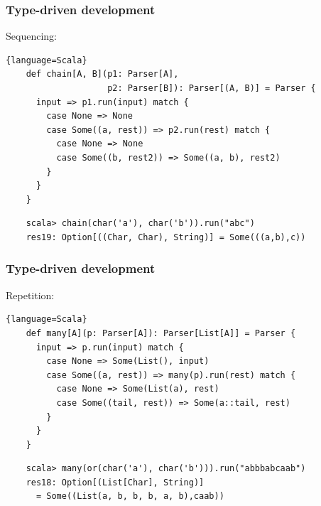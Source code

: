 \documentclass{beamer}
\begin{document}
\begin{frame}[containsverbatim]
  \frametitle{Type-driven development} 

  Sequencing:

  \begin{lstlisting}{language=Scala}
    def chain[A, B](p1: Parser[A],
                    p2: Parser[B]): Parser[(A, B)] = Parser {
      input => p1.run(input) match {
        case None => None
        case Some((a, rest)) => p2.run(rest) match {
          case None => None
          case Some((b, rest2)) => Some((a, b), rest2)
        }
      }
    }
  \end{lstlisting}

  \begin{lstlisting}
    scala> chain(char('a'), char('b')).run("abc")
    res19: Option[((Char, Char), String)] = Some(((a,b),c))
  \end{lstlisting}
  
\end{frame}



\begin{frame}[containsverbatim]
  \frametitle{Type-driven development} 

  Repetition:

  \begin{lstlisting}{language=Scala}
    def many[A](p: Parser[A]): Parser[List[A]] = Parser {
      input => p.run(input) match {
        case None => Some(List(), input)
        case Some((a, rest)) => many(p).run(rest) match {
          case None => Some(List(a), rest)
          case Some((tail, rest)) => Some(a::tail, rest)
        }               
      }
    }
  \end{lstlisting}

  \begin{lstlisting}
    scala> many(or(char('a'), char('b'))).run("abbbabcaab")
    res18: Option[(List[Char], String)] 
      = Some((List(a, b, b, b, a, b),caab))
  \end{lstlisting}
  
\end{frame}
\end{document}
